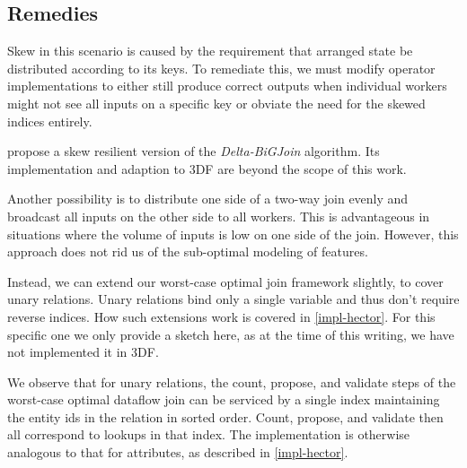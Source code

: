 \documentclass[../catalog.tex]{subfiles}
\begin{document}
\subsection{Remedies}

Skew in this scenario is caused by the requirement that arranged state
be distributed according to its keys. To remediate this, we must
modify operator implementations to either still produce correct
outputs when individual workers might not see all inputs on a specific
key or obviate the need for the skewed indices entirely.

\cite{ammar2018distributed} propose a skew resilient version of the
\emph{Delta-BiGJoin} algorithm. Its implementation and adaption to 3DF
are beyond the scope of this work.

Another possibility is to distribute one side of a two-way join evenly
and broadcast all inputs on the other side to all workers. This is
advantageous in situations where the volume of inputs is low on one
side of the join. However, this approach does not rid us of the
sub-optimal modeling of features.

Instead, we can extend our worst-case optimal join framework slightly,
to cover unary relations. Unary relations bind only a single variable
and thus don't require reverse indices. How such extensions work is
covered in \autoref{impl-hector}. For this specific one we only
provide a sketch here, as at the time of this writing, we have not
implemented it in 3DF.

We observe that for unary relations, the count, propose, and validate
steps of the worst-case optimal dataflow join can be serviced by a
single index maintaining the entity ids in the relation in sorted
order. Count, propose, and validate then all correspond to lookups in
that index. The implementation is otherwise analogous to that for
attributes, as described in \autoref{impl-hector}.
\end{document}
